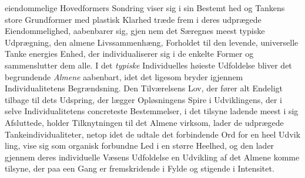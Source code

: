 eiendommelige Hovedformers Sondring viser sig i sin Bestemt\-%
hed og Tankens store Grundformer med plastisk Klarhed træde
frem i deres udprægede Eiendommelighed, aabenbarer sig, gjen\-%
nem det Særegnes meest typiske Udprægning, den almene
Livssammenhæng, Forholdet til den levende, universelle Tanke\-%
energies Enhed, der individualiserer sig i de enkelte Former og
sammenslutter dem alle. I det \emph{typiske} Individuelles høieste
Udfoldelse bliver det begrundende \emph{Almene} aabenbart, idet
det ligesom bryder igjennem Individualitetens Begrændsning.
Den Tilværelsens Lov, der fører alt Endeligt tilbage til dets
Udspring, der lægger Opløsningens Spire i Udviklingens, der
i selve Individualitetens concreteste Bestemmelser, i det tilsyne\-%
ladende meest i sig Afsluttede, holder Tilknytningen til det
Almene virksom, lader de udprægede Tankeindividualiteter,
netop idet de udtale det forbindende Ord for en heel Udvik\-%
ling, vise sig som organisk forbundne Led i en større Heelhed,
og den lader gjennem deres individuelle Væsens Udfoldelse en
Udvikling af det Almene komme tilsyne, der paa een Gang er
fremskridende i Fylde og stigende i Intensitet.

